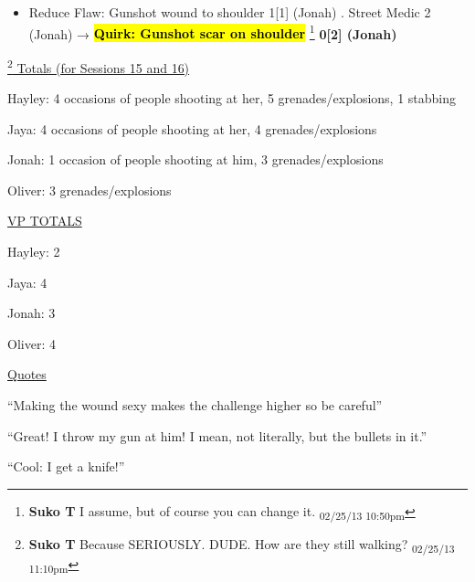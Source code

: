\begin{itemize}
\item  {\color[RGB]{255,0,0}Reduce Flaw: }  {\color[RGB]{255,0,0}Gunshot wound to shoulder}  {\color[RGB]{255,0,0} 1{[}1{]} (Jonah)} .  Street Medic 2 (Jonah) → \textbf{ {\color[RGB]{255,0,0}\hl{Quirk: Gunshot scar on shoulder}} }\footnote{\textbf{Suko T }I assume, but of course you can change it. \textsubscript{02/25/13 10:50pm}}\textbf{ {\color[RGB]{255,0,0}0{[}2{]} (Jonah)} }
\end{itemize}


\footnote{\textbf{Suko T }Because SERIOUSLY.  DUDE.  How are they still walking? \textsubscript{02/25/13 11:10pm}}\underline{  Totals (for Sessions 15 and 16) }

Hayley: 4 occasions of people shooting at her, 5 grenades/explosions, 1 stabbing

Jaya: 4 occasions of people shooting at her, 4 grenades/explosions

Jonah: 1 occasion of people shooting at him,  3 grenades/explosions

Oliver: 3 grenades/explosions



\underline{  {\LARGE VP TOTALS }  }

Hayley: 2

Jaya: 4

Jonah: 3

Oliver: 4



\underline{  {\LARGE Quotes }  }



``Making the wound sexy makes the challenge higher so be careful''




``Great!  I throw my gun at him!  I mean, not literally, but the bullets in it.''






``Cool: I get a knife!''



